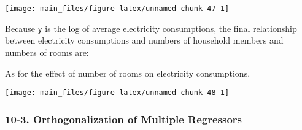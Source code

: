 \documentclass[main.tex]{subfiles}
\begin{document}
\begin{center}\texttt{[image: main\_files/figure-latex/unnamed-chunk-47-1]} \end{center}

Because \texttt{y} is the log of average electricity consumptions, the
final relationship between electricity consumptions and numbers of
household members and numbers of rooms are:

As for the effect of number of rooms on electricity consumptions,

\begin{center}\texttt{[image: main\_files/figure-latex/unnamed-chunk-48-1]} \end{center}

\hypertarget{orthogonalization-of-multiple-regressors}{%
\subsubsection{10-3. Orthogonalization of Multiple
Regressors}\label{orthogonalization-of-multiple-regressors}}

\begin{Shaded}
\end{Shaded}
\end{document}
